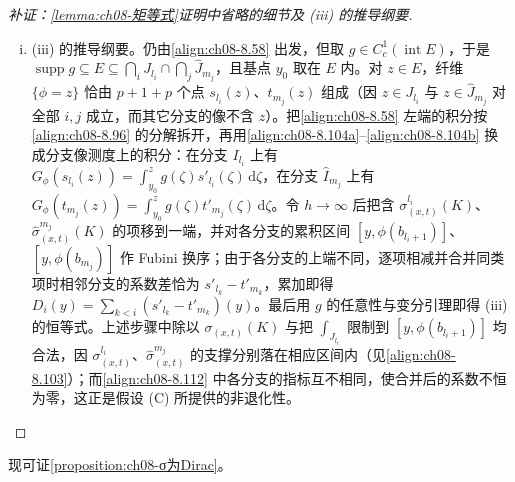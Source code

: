 \documentclass[../../main.tex]{subfiles}%
\begin{document}
\begin{proof}[补证：\cref{lemma:ch08-矩等式}证明中省略的细节及 (iii) 的推导纲要]
\begin{enumerate}[(i)]
\item (iii) 的推导纲要。仍由\eqref{align:ch08-8.58} 出发，但取 $g\in C_c^1(\operatorname{int}E)$，于是 $\operatorname{supp}g\subseteq E\subseteq\bigcap_iJ_{l_i}\cap\bigcap_j\widehat J_{m_j}$，且基点 $y_0$ 取在 $E$ 内。对 $z\in E$，纤维 $\{\phi=z\}$ 恰由 $p+1+p$ 个点 $s_{l_i}(z)$、$t_{m_j}(z)$ 组成（因 $z\in J_{l_i}$ 与 $z\in\widehat J_{m_j}$ 对全部 $i,j$ 成立，而其它分支的像不含 $z$）。把\eqref{align:ch08-8.58} 左端的积分按\eqref{align:ch08-8.96} 的分解拆开，再用\eqref{align:ch08-8.104a}--\eqref{align:ch08-8.104b} 换成分支像测度上的积分：在分支 $I_{l_i}$ 上有 $G_\phi(s_{l_i}(z))=\int_{y_0}^z g(\zeta)s'_{l_i}(\zeta)\,\mathrm{d}\zeta$，在分支 $\widehat I_{m_j}$ 上有 $G_\phi(t_{m_j}(z))=\int_{y_0}^z g(\zeta)t'_{m_j}(\zeta)\,\mathrm{d}\zeta$。令 $h\to\infty$ 后把含 $\sigma^{l_i}_{(x,t)}(K)$、$\widehat\sigma^{m_j}_{(x,t)}(K)$ 的项移到一端，并对各分支的累积区间 $[y,\phi(b_{l_i+1})]$、$[y,\phi(b_{m_j})]$ 作 Fubini 换序；由于各分支的上端不同，逐项相减并合并同类项时相邻分支的系数差恰为 $s'_{l_k}-t'_{m_k}$，累加即得 $D_i(y)=\sum_{k<i}(s'_{l_k}-t'_{m_k})(y)$。最后用 $g$ 的任意性与变分引理即得 (iii) 的恒等式。上述步骤中除以 $\sigma_{(x,t)}(K)$ 与把 $\int_{J_{l_i}}$ 限制到 $[y,\phi(b_{l_i+1})]$ 均合法，因 $\sigma^{l_i}_{(x,t)}$、$\widehat\sigma^{m_j}_{(x,t)}$ 的支撑分别落在相应区间内（见\eqref{align:ch08-8.103}）；而\eqref{align:ch08-8.112} 中各分支的指标互不相同，使合并后的系数不恒为零，这正是假设 (C) 所提供的非退化性。
\end{enumerate}
\end{proof}

现可证\cref{proposition:ch08-σ为Dirac}。
\end{document}
